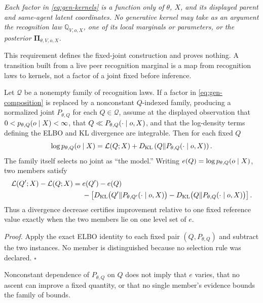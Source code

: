 \emph{Each factor in \eqref{eq:gen-kernels} is a function only of $\theta$, $X$, and its displayed
parent and same-agent latent coordinates.  No generative kernel may take as an argument the
recognition law $\mathbb Q_{V,o,X}$, one of its local marginals or parameters, or the posterior $\boldsymbol\Pi_{\theta,V,o,X}$.}

This requirement defines the fixed-joint construction and proves nothing.  A transition built from
a live peer recognition marginal is a map from recognition laws to kernels, not a factor of a
joint fixed before inference.

Let $\mathcal Q$ be a nonempty family of recognition laws.  If a factor in
\eqref{eq:gen-composition} is replaced by a nonconstant $Q$-indexed family, producing a normalized
joint $P_{\theta,Q}$ for each $Q\in\mathcal Q$, assume at the displayed observation that
$0<p_{\theta,Q}(o\mid X)<\infty$, that
$Q\ll P_{\theta,Q}(\cdot\mid o,X)$, and that the log-density terms defining the ELBO and KL
divergence are integrable. Then for each fixed $Q$
\begin{equation}
\log p_{\theta,Q}(o\mid X)
=\mathcal L(Q;X)
+D_{\mathrm{KL}}\left(Q\middle\Vert P_{\theta,Q}(\cdot\mid o,X)\right).
\label{eq:gen-moving-target}
\end{equation}
The family itself selects no joint as ``the model.''  Writing
$e(Q)=\log p_{\theta,Q}(o\mid X)$, two members satisfy
\begin{equation}
\begin{aligned}
\mathcal L(Q';X)-\mathcal L(Q;X)
={}&e(Q')-e(Q)\\
&-\left[
D_{\mathrm{KL}}\bigl(Q'\Vert P_{\theta,Q'}(\cdot\mid o,X)\bigr)
-D_{\mathrm{KL}}\bigl(Q\Vert P_{\theta,Q}(\cdot\mid o,X)\bigr)
\right].
\end{aligned}
\label{eq:gen-elbo-difference}
\end{equation}
Thus a divergence decrease certifies improvement relative to one fixed reference value exactly
when the two members lie on one level set of $e$. 

\noindent\emph{Proof.}
Apply the exact ELBO identity to each fixed pair $(Q,P_{\theta,Q})$ and subtract the two
instances.  No member is distinguished because no selection rule was declared. \hfill$\square$

Nonconstant dependence of $P_{\theta,Q}$ on $Q$ does not imply that $e$ varies, that no ascent can
improve a fixed quantity, or that no single member's evidence bounds the family of bounds.


